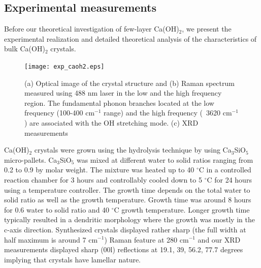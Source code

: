 \subsection{Experimental measurements}


Before our theoretical investigation of few-layer Ca(OH)$_{2}$, we 
present the experimental realization and detailed theoretical analysis of the
characteristics of bulk Ca(OH)$_{2}$ crystals.


\begin{figure}[htbp]
\centering
\texttt{[image: exp\_caoh2.eps]}
\caption{\label{fig:exp_caoh2} (a) Optical image of the crystal structure and (b) Raman 
spectrum measured using 488 nm laser in the low and the high frequency region. 
The fundamental phonon branches located at the low frequency (100-400 cm$^{-1}$  range) and the high frequency (~3620 cm$^{-1}$) are associated with the OH  stretching mode. (c) XRD measurements}
\end{figure}

Ca(OH)$_{2}$ crystals were grown using the hydrolysis technique by using 
Ca$_{3}$SiO$_{5}$ micro-pallets. Ca$_{3}$SiO$_{5}$ was mixed at different water 
to solid ratios ranging from 0.2 to 0.9 by molar weight. The mixture was heated 
up to 40 $^{\circ}\mathrm{C}$ in a controlled reaction chamber for 3 hours and 
controllably cooled down to 5 $^{\circ}\mathrm{C}$ for 24 hours using a
temperature controller. The growth time depends on the total water to solid 
ratio as well as the growth temperature. Growth time was around 8 hours for 0.6 
water to solid ratio and 40 $^{\circ}\mathrm{C}$ growth temperature. 
Longer growth time typically resulted in a dendritic morphology where the 
growth was mostly in the c-axis direction. Synthesized crystals displayed rather sharp (the full width at half maximum is around 7 cm$^{-1}$) Raman feature at 280 cm$^{-1}$ and our XRD measurements displayed sharp (00l) reflections at 19.1, 39, 56.2, 77.7 degrees implying that crystals have lamellar nature.  
 

